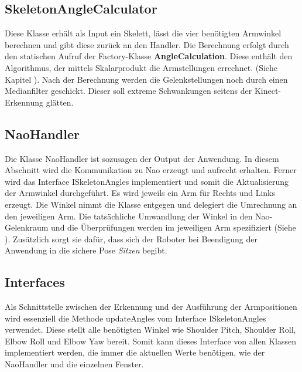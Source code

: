 %
%

\subsection{SkeletonAngleCalculator}
Diese Klasse erhält als Input ein Skelett, lässt die vier benötigten Armwinkel berechnen und gibt diese zurück an den Handler. Die Berechnung erfolgt durch den statischen Aufruf der Factory-Klasse \textbf{AngleCalculation}. Diese enthält den Algorithmus, der mittels Skalarprodukt die Armstellungen errechnet. (Siehe Kapitel ). Nach der Berechnung werden die Gelenkstellungen noch durch einen Medianfilter geschickt. Dieser soll extreme Schwankungen seitens der Kinect-Erkennung glätten.

\subsection{NaoHandler}
Die Klasse \textsf{NaoHandler} ist sozusagen der Output der Anwendung. In diesem Abschnitt wird die Kommunikation zu Nao erzeugt und aufrecht erhalten. Ferner wird das Interface \textsf{ISkeletonAngles} implementiert und somit die Aktualisierung der Armwinkel durchgeführt. Es wird jeweils ein Arm für Rechts und Links erzeugt. Die Winkel nimmt die Klasse entgegen und delegiert die Umrechnung an den jeweiligen Arm. Die tatsächliche Umwandlung der Winkel in den Nao-Gelenkraum und die Überprüfungen werden im jeweiligen Arm spezifiziert (Siehe ). Zusätzlich sorgt sie dafür, dass sich der Roboter bei Beendigung der Anwendung in die sichere Pose \textit{Sitzen} begibt.



\subsection{Interfaces}
Als Schnittstelle zwischen der Erkennung und der Ausführung der Armpositionen wird essenziell die Methode \textsf{updateAngles} vom Interface \textsf{ISkeletonAngles} verwendet. Diese stellt alle benötigten Winkel wie Shoulder Pitch, Shoulder Roll, Elbow Roll und Elbow Yaw bereit. Somit kann dieses Interface von allen Klassen implementiert werden, die immer die aktuellen Werte benötigen, wie der NaoHandler und die einzelnen Fenster.


